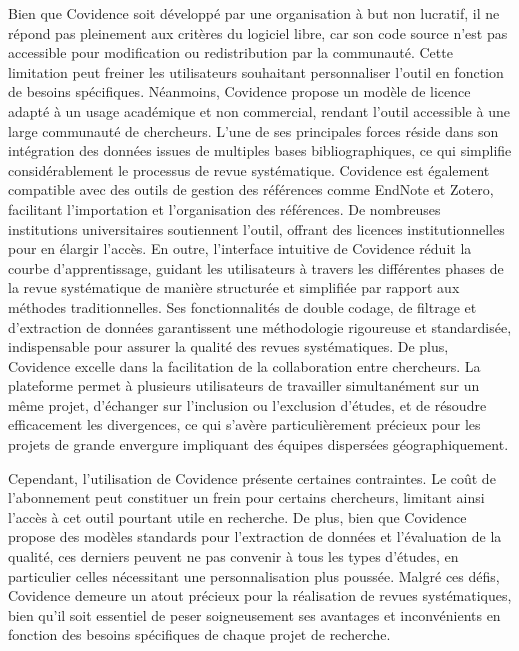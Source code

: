 \documentclass[
  letterpaper,
  DIV=11,
  numbers=noendperiod]{scrreprt}
\begin{document}
Bien que Covidence soit développé par une organisation à but non
lucratif, il ne répond pas pleinement aux critères du logiciel libre,
car son code source n'est pas accessible pour modification ou
redistribution par la communauté. Cette limitation peut freiner les
utilisateurs souhaitant personnaliser l'outil en fonction de besoins
spécifiques. Néanmoins, Covidence propose un modèle de licence adapté à
un usage académique et non commercial, rendant l'outil accessible à une
large communauté de chercheurs. L'une de ses principales forces réside
dans son intégration des données issues de multiples bases
bibliographiques, ce qui simplifie considérablement le processus de
revue systématique. Covidence est également compatible avec des outils
de gestion des références comme EndNote et Zotero, facilitant
l'importation et l'organisation des références. De nombreuses
institutions universitaires soutiennent l'outil, offrant des licences
institutionnelles pour en élargir l'accès. En outre, l'interface
intuitive de Covidence réduit la courbe d'apprentissage, guidant les
utilisateurs à travers les différentes phases de la revue systématique
de manière structurée et simplifiée par rapport aux méthodes
traditionnelles. Ses fonctionnalités de double codage, de filtrage et
d'extraction de données garantissent une méthodologie rigoureuse et
standardisée, indispensable pour assurer la qualité des revues
systématiques. De plus, Covidence excelle dans la facilitation de la
collaboration entre chercheurs. La plateforme permet à plusieurs
utilisateurs de travailler simultanément sur un même projet, d'échanger
sur l'inclusion ou l'exclusion d'études, et de résoudre efficacement les
divergences, ce qui s'avère particulièrement précieux pour les projets
de grande envergure impliquant des équipes dispersées géographiquement.

Cependant, l'utilisation de Covidence présente certaines contraintes. Le
coût de l'abonnement peut constituer un frein pour certains chercheurs,
limitant ainsi l'accès à cet outil pourtant utile en recherche. De plus,
bien que Covidence propose des modèles standards pour l'extraction de
données et l'évaluation de la qualité, ces derniers peuvent ne pas
convenir à tous les types d'études, en particulier celles nécessitant
une personnalisation plus poussée. Malgré ces défis, Covidence demeure
un atout précieux pour la réalisation de revues systématiques, bien
qu'il soit essentiel de peser soigneusement ses avantages et
inconvénients en fonction des besoins spécifiques de chaque projet de
recherche.
\end{document}
